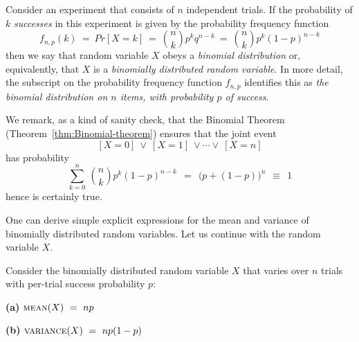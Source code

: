   
Consider an experiment that consists of $n$ independent trials.  If the probability of $k$ {\em successes} in this experiment is given by the probability frequency function
\begin{equation}
\label{eq:binomial-prob-freq}
f_{n,p}(k) \ = \ Pr[X=k] \ = \ {n \choose k} p^k q^{n-k} \ = \ {n \choose k} p^k (1-p)^{n-k}
\end{equation}
then we say that random variable $X$ obeys a {\em binomial distribution} or, equivalently, that $X$ is a {\em binomially distributed random variable}.  In more detail, the subscript on the probability frequency function $f_{n,p}$ identifies this as {\em the binomial distribution on $n$ items, with probability $p$ of success}.

We remark, as a kind of sanity check, that the Binomial Theorem (Theorem~\ref{thm:Binomial-theorem}) ensures that the joint event
\[ [X=0] \ \vee \ [X=1] \ \vee \cdots  \vee \ [X=n] \]
has probability
\[ \sum_{k=0}^n \ {n \choose k} p^k (1-p)^{n-k} \ \ = \ \  \big(p + (1-p) \big)^n \ \ \equiv \ \ 1 \] 
hence is certainly {\sc true}.

\bigskip

One can derive simple explicit expressions for the mean and variance of binomially distributed random variables.  Let us continue with the random variable $X$.

\begin{prop}
\label{thm:bin-vble-mean+variance}
Consider the binomially distributed random variable $X$ that varies over $n$ trials with per-trial success probability $p$:

{\bf (a)} $\mbox{\sc mean}(X) \ = \ np$

{\bf (b)} $\mbox{\sc variance}(X) \ = \ np(1-p)$
\end{prop}

